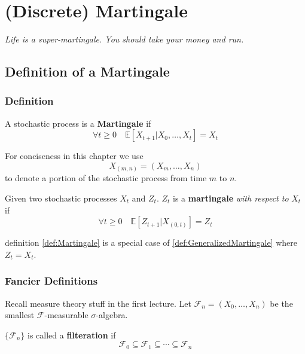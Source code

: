 \chapter{(Discrete) Martingale}
\emph{Life is a super-martingale. You should take your money and run.}
\newpage


\section{Definition of a Martingale}
    \subsection{Definition}
        \begin{definition}[Martingale]\label{def:Martingale}
            A stochastic process is a \textbf{Martingale} if
            \[ \forall t \ge 0 \quad \mathbb{E}[X_{t+1}|X_0,\dots,X_t] = X_t \]
        \end{definition}

        For conciseness in this chapter we use
        \[ X_{(m,n)} = (X_m,\dots,X_n) \]
        to denote a portion of the stochastic process from time $m$ to $n$.

        \begin{definition}\label{def:GeneralizedMartingale}
            Given two stochastic processes $X_t$ and $Z_t$. $Z_t$ is a \textbf{martingale} \emph{with respect to} $X_t$ if
            \[ \forall t \ge 0 \quad \mathbb{E}[Z_{t+1} | X_{(0,t)}] = Z_t \]
        \end{definition}
        \begin{remark}
            definition \ref{def:Martingale} is a special case of \ref{def:GeneralizedMartingale} where $Z_t = X_t$.
        \end{remark}

    \subsection{Fancier Definitions}
        Recall measure theory stuff in the first lecture.
        Let $\mathcal{F}_n = (X_0,\dots,X_n)$ be the smallest $\mathcal{F}$-measurable $\sigma$-algebra.
        \begin{definition}[Filteration]
            $\{\mathcal{F}_n\}$ is called a \textbf{filteration} if
            \[ \mathcal{F}_0 \subseteq \mathcal{F}_1 \subseteq \cdots \subseteq \mathcal{F}_n \] 
        \end{definition}

